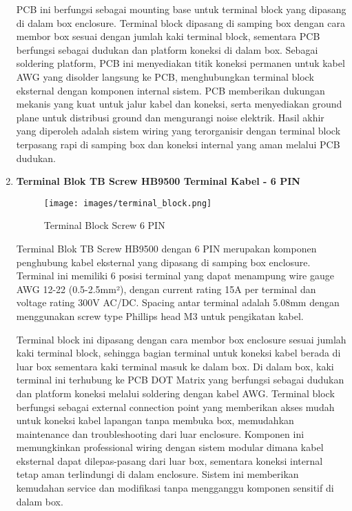 \documentclass[12pt,a4paper]{article}
\begin{document}
\begin{enumerate}[leftmargin=0pt,itemsep=1em]
PCB ini berfungsi sebagai mounting base untuk terminal block yang dipasang di dalam box enclosure. Terminal block dipasang di samping box dengan cara membor box sesuai dengan jumlah kaki terminal block, sementara PCB berfungsi sebagai dudukan dan platform koneksi di dalam box. Sebagai soldering platform, PCB ini menyediakan titik koneksi permanen untuk kabel AWG yang disolder langsung ke PCB, menghubungkan terminal block eksternal dengan komponen internal sistem. PCB memberikan dukungan mekanis yang kuat untuk jalur kabel dan koneksi, serta menyediakan ground plane untuk distribusi ground dan mengurangi noise elektrik. Hasil akhir yang diperoleh adalah sistem wiring yang terorganisir dengan terminal block terpasang rapi di samping box dan koneksi internal yang aman melalui PCB dudukan.

\item \textbf{Terminal Blok TB Screw HB9500 Terminal Kabel - 6 PIN}

\begin{figure}[H]
\centering
\texttt{[image: images/terminal\_block.png]}
\caption{Terminal Block Screw 6 PIN}
\label{fig:terminal_block}
\end{figure}

Terminal Blok TB Screw HB9500 dengan 6 PIN merupakan komponen penghubung kabel eksternal yang dipasang di samping box enclosure. Terminal ini memiliki 6 posisi terminal yang dapat menampung wire gauge AWG 12-22 (0.5-2.5mm²), dengan current rating 15A per terminal dan voltage rating 300V AC/DC. Spacing antar terminal adalah 5.08mm dengan menggunakan screw type Phillips head M3 untuk pengikatan kabel.

Terminal block ini dipasang dengan cara membor box enclosure sesuai jumlah kaki terminal block, sehingga bagian terminal untuk koneksi kabel berada di luar box sementara kaki terminal masuk ke dalam box. Di dalam box, kaki terminal ini terhubung ke PCB DOT Matrix yang berfungsi sebagai dudukan dan platform koneksi melalui soldering dengan kabel AWG. Terminal block berfungsi sebagai external connection point yang memberikan akses mudah untuk koneksi kabel lapangan tanpa membuka box, memudahkan maintenance dan troubleshooting dari luar enclosure. Komponen ini memungkinkan professional wiring dengan sistem modular dimana kabel eksternal dapat dilepas-pasang dari luar box, sementara koneksi internal tetap aman terlindungi di dalam enclosure. Sistem ini memberikan kemudahan service dan modifikasi tanpa mengganggu komponen sensitif di dalam box.


\end{enumerate}
\end{document}

